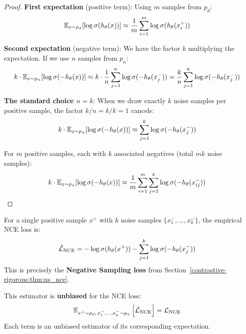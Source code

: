 \begin{notechapter}
\begin{proof}
\textbf{First expectation} (positive term): Using $m$ samples from $p_d$:
\begin{equation}
\mathbb{E}_{x \sim p_d}[\log \sigma(h_\theta(x))] \approx \frac{1}{m} \sum_{i=1}^{m} \log \sigma(h_\theta(x_i^+))
\end{equation}

\textbf{Second expectation} (negative term): We have the factor $k$ multiplying the expectation. If we use $n$ samples from $p_n$:
\begin{equation}
k \cdot \mathbb{E}_{x \sim p_n}[\log \sigma(-h_\theta(x))] \approx k \cdot \frac{1}{n} \sum_{j=1}^{n} \log \sigma(-h_\theta(x_j^-)) = \frac{k}{n} \sum_{j=1}^{n} \log \sigma(-h_\theta(x_j^-))
\end{equation}

\textbf{The standard choice $n = k$}: When we draw exactly $k$ noise samples per positive sample, the factor $k/n = k/k = 1$ cancels:
\begin{equation}
k \cdot \mathbb{E}_{x \sim p_n}[\log \sigma(-h_\theta(x))] \approx \sum_{j=1}^{k} \log \sigma(-h_\theta(x_j^-))
\end{equation}

For $m$ positive samples, each with $k$ associated negatives (total $mk$ noise samples):
\begin{equation}
k \cdot \mathbb{E}_{x \sim p_n}[\log \sigma(-h_\theta(x))] \approx \frac{1}{m} \sum_{i=1}^{m} \sum_{j=1}^{k} \log \sigma(-h_\theta(x_{ij}^-))
\end{equation}
\end{proof}

\begin{remark}[Special Case: Single Positive Sample ($m = 1$)]
\label{contrastive-rigorous:rmk:single_sample}
For a single positive sample $x^+$ with $k$ noise samples $\{x_1^-, \ldots, x_k^-\}$, the empirical NCE loss is:
\begin{equation}
\hat{\mathcal{L}}_{\text{NCE}} = -\log \sigma(h_\theta(x^+)) - \sum_{j=1}^{k} \log \sigma(-h_\theta(x_j^-))
\end{equation}
This is precisely the \textbf{Negative Sampling loss} from Section~\ref{contrastive-rigorous:thm:ns_nce}.

This estimator is \textbf{unbiased} for the NCE loss:
\begin{equation}
\mathbb{E}_{x^+ \sim p_d, \, x_1^-, \ldots, x_k^- \sim p_n}\left[\hat{\mathcal{L}}_{\text{NCE}}\right] = \mathcal{L}_{\text{NCE}}
\end{equation}
Each term is an unbiased estimator of its corresponding expectation.
\end{remark}


\end{notechapter}
